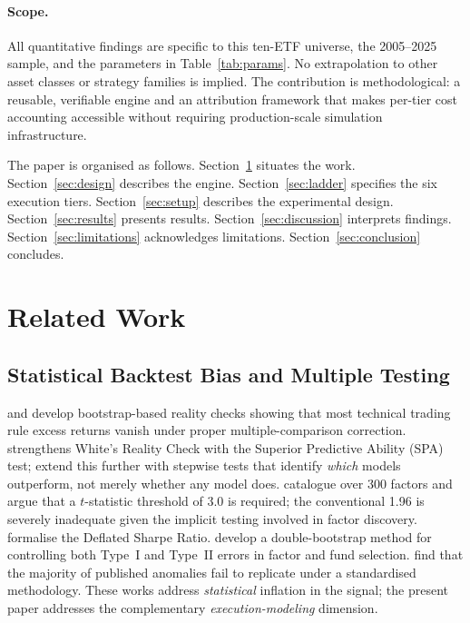 \documentclass[12pt]{article}
\begin{document}
\paragraph{Scope.}
All quantitative findings are specific to this ten-ETF universe,
the 2005--2025 sample, and the parameters in Table~\ref{tab:params}.
No extrapolation to other asset classes or strategy families is
implied. The contribution is methodological: a reusable, verifiable
engine and an attribution framework that makes per-tier cost accounting
accessible without requiring production-scale simulation infrastructure.

The paper is organised as follows. Section~\ref{sec:related} situates
the work. Section~\ref{sec:design} describes the engine.
Section~\ref{sec:ladder} specifies the six execution tiers.
Section~\ref{sec:setup} describes the experimental design.
Section~\ref{sec:results} presents results.
Section~\ref{sec:discussion} interprets findings.
Section~\ref{sec:limitations} acknowledges limitations.
Section~\ref{sec:conclusion} concludes.


\section{Related Work}
\label{sec:related}

\subsection{Statistical Backtest Bias and Multiple Testing}

\citet{white2000reality} and \citet{sullivan1999data} develop
bootstrap-based reality checks showing that most technical trading rule
excess returns vanish under proper multiple-comparison correction.
\citet{hansen2005test} strengthens White's Reality Check with the
Superior Predictive Ability (SPA) test; \citet{romano2005stepwise}
extend this further with stepwise tests that identify \emph{which}
models outperform, not merely whether any model does.
\citet{harvey2016and} catalogue over 300 factors and argue that a
$t$-statistic threshold of 3.0 is required; the conventional 1.96 is
severely inadequate given the implicit testing involved in factor
discovery. \citet{bailey2014deflated} formalise the Deflated Sharpe
Ratio. \citet{harvey2020false} develop a double-bootstrap method for
controlling both Type~I and Type~II errors in factor and fund
selection. \citet{hou2020replicating} find that the majority of
published anomalies fail to replicate under a standardised methodology.
These works address \emph{statistical} inflation in the signal;
the present paper addresses the complementary \emph{execution-modeling}
dimension.
\end{document}
